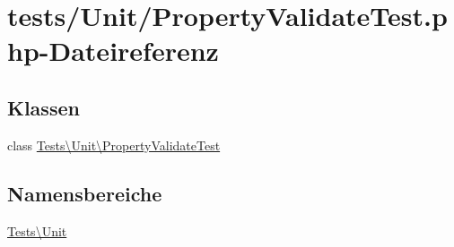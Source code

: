 \hypertarget{PropertyValidateTest_8php}{}\section{tests/\+Unit/\+Property\+Validate\+Test.php-\/\+Dateireferenz}
\label{PropertyValidateTest_8php}
\subsection*{Klassen}
\begin{DoxyCompactItemize}
\item 
class \hyperlink{classTests_1_1Unit_1_1PropertyValidateTest}{Tests\textbackslash{}\+Unit\textbackslash{}\+Property\+Validate\+Test}
\end{DoxyCompactItemize}
\subsection*{Namensbereiche}
\begin{DoxyCompactItemize}
\item 
 \hyperlink{namespaceTests_1_1Unit}{Tests\textbackslash{}\+Unit}
\end{DoxyCompactItemize}
